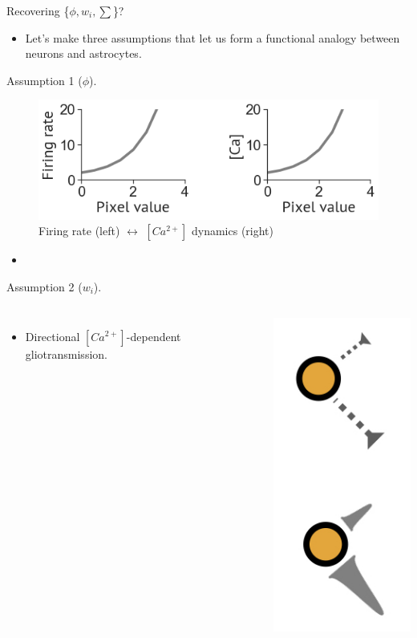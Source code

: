 \documentclass[10pt]{beamer}
\begin{document}
\begin{frame}[fragile]{Recovering \{$\phi, w_i, \sum $\}?}
\begin{itemize}
    \item Let's make three assumptions that let us form a functional analogy between neurons and astrocytes.
\end{itemize}
\end{frame}

\begin{frame}[fragile]{Assumption 1 ($\phi$).}
\begin{figure}
    \centering
    \includegraphics[scale=0.4]{images/phi_ca.png}
    \caption{Firing rate (left) $\leftrightarrow$ $[Ca^{2+}]$ dynamics (right)}
\end{figure}
\begin{itemize}
    \item 
\end{itemize}
\end{frame}

\begin{frame}[fragile]{Assumption 2 ($w_i$).}
\begin{columns}
\begin{itemize}
    \item \alert{Directional} $[Ca^{2+}]$-dependent gliotransmission.
\end{itemize}
    \centering
    \includegraphics[scale=0.4]{images/gliotrans.jpeg}
\end{columns}
\end{frame}
\end{document}
